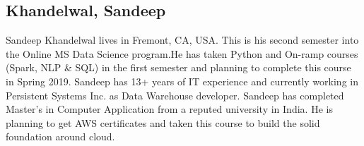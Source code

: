 \subsection{Khandelwal, Sandeep}

Sandeep Khandelwal lives in Fremont, CA, USA. This is his second semester into the Online MS Data Science program.He has taken Python and On-ramp courses (Spark, NLP & SQL) in the first semester and planning to complete this course in Spring 2019. Sandeep has 13+ years of IT experience and currently working in Persistent Systems Inc. as Data Warehouse developer. Sandeep has completed Master's in Computer Application from a reputed university in India. He is planning to get AWS certificates and taken this course to build the solid foundation around cloud.
